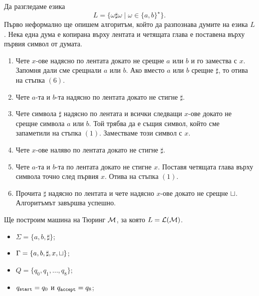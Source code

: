 \begin{example}
  Да разгледаме езика
  \[L = \{\omega \sharp \omega \mid \omega\in\{a,b\}^\star\}.\]
  Първо неформално ще опишем алгоритъм, който да разпознава думите на езика $L$.
  Нека една дума е копирана върху лентата и четящата глава е поставена върху първия символ от думата.
  \begin{enumerate}[(1)]
  \item
    Чете $x$-ове надясно по лентата докато не срещне $a$ или $b$ и го замества с $x$.
    Запомня дали сме срещнали $a$ или $b$.
    Ако вместо $a$ или $b$ срещне $\sharp$, то отива на стъпка $(6)$.
  \item
    Чете $a$-та и $b$-та надясно по лентата докато не стигне $\sharp$. 
  \item
    Чете символа $\sharp$ надясно по лентата и всички следващи $x$-ове докато не срещне символа $a$ или $b$.
    Той трябва да е същия символ, който сме запаметили на стъпка $(1)$.
    Заместваме този символ с $x$.
  \item
    Чете $x$-ове наляво по лентата докато не стигне $\sharp$.
  \item
    Чете $a$-та и $b$-та по лентата докато не стигне $x$.
    Поставя четящата глава върху символа точно след първия $x$.
    Отива на стъпка $(1)$.
  \item
    Прочита $\sharp$ надясно по лентата и чете надясно $x$-ове докато не срещне $\sqcup$.
    Алгоритъмът завършва успешно.
  \end{enumerate}
  Ще построим машина на Тюринг $\mathcal{M}$, за която $L = \mathcal{L}(\mathcal{M})$.
  \begin{itemize}
  \item 
    $\Sigma = \{a,b,\sharp\}$;
  \item
    $\Gamma = \{a,b,\sharp,x,\sqcup\}$;
  \item
    $Q = \{q_0,q_1,\dots,q_8\}$;
  \item
    $q_{\texttt{start}} = q_0$ и $q_{\texttt{accept}} = q_8$;
  \end{itemize}


\end{example}
